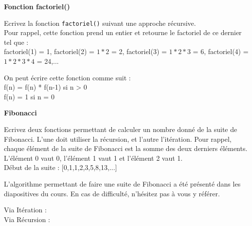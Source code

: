 	\begin{Exercice}[10 minutes] \textbf{Fonction factoriel()} 
	
	Ecrivez la fonction \lstinline{factoriel()} suivant une approche récursive. \\ 
	
	Pour rappel, cette fonction prend un entier et retourne le factoriel de ce dernier tel que : \\
	
	factoriel(1) = 1, factoriel(2) = $1*2$ = 2, factoriel(3) = $1*2*3$ = 6, factoriel(4) = $1*2*3*4$ = 24,...
	  
	
		\begin{conseil} 
		On peut écrire cette fonction comme suit : \\
		
		f(n) = f(n) * f(n-1) si n > 0 \\
		
		f(n) = 1 si n = 0
		
		\end{conseil} 
	
		\begin{solution} 
			
		\end{solution} 
	
	\end{Exercice}
	
	\begin{Exercice}[15 minutes] \textbf{Fibonacci} 
	
	Ecrivez deux fonctions permettant de calculer un nombre donné de la suite de Fibonacci. L'une doit utiliser la récursion, et l'autre l'itération. Pour rappel, chaque élément de la suite de Fibonacci est la somme des deux derniers éléments. L'élément 0 vaut 0, l'élément 1 vaut 1 et l'élément 2 vaut 1. \\
	
	Début de la suite : [0,1,1,2,3,5,8,13,...]
	  
	
		\begin{conseil} 
			L'algorithme permettant de faire une suite de Fibonacci a été présenté dans les diapositives du cours. En cas de difficulté, n'hésitez pas à vous y référer.
		\end{conseil} 
	
		\begin{solution}
			Via Itération : \\
			
				 
				
			Via Récursion : \\
			
				
		\end{solution} 
	
	\end{Exercice}
    
    


